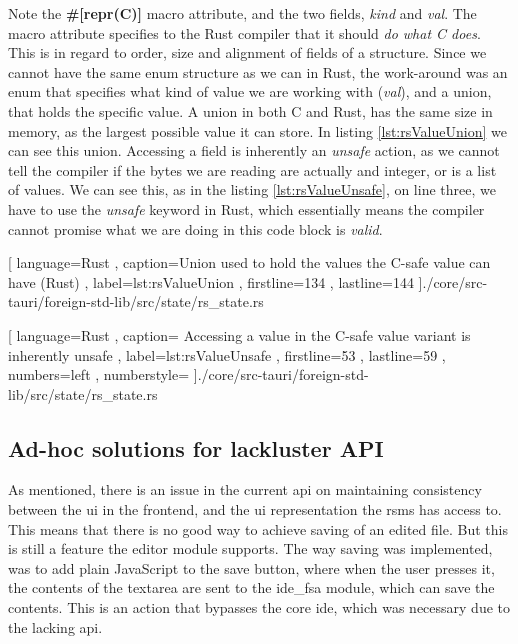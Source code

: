 Note the \textbf{\#[repr(C)]} macro attribute, and the two fields,
\textit{kind} and \textit{val}. The macro attribute specifies to the Rust
compiler that it should \textit{do what C does}. This is in regard to order,
size and alignment of fields of a structure. Since we cannot have the same enum
structure as we can in Rust, the work-around was an enum that specifies what
kind of value we are working with (\textit{val}), and a union, that holds the
specific value. A union in both C and Rust, has the same size in memory, as the
largest possible value it can store. In listing \ref{lst:rsValueUnion} we can
see this union. Accessing a field is inherently an \textit{unsafe} action, as we
cannot tell the compiler if the bytes we are reading are actually and integer,
or is a list of values. We can see this, as in the listing
\ref{lst:rsValueUnsafe}, on line three, we have to use the \textit{unsafe}
keyword in Rust, which essentially means the compiler cannot promise what we are
doing in this code block is \textit{valid}.

\begin{code}
  
    [ language=Rust
    , caption={Union used to hold the values the C-safe value can have (Rust)}
    , label=lst:rsValueUnion
    , firstline=134
    , lastline=144
    ]{./core/src-tauri/foreign-std-lib/src/state/rs\_state.rs}
\end{code}

\begin{code}
  
    [ language=Rust
    , caption={
      Accessing a value in the C-safe value variant is inherently unsafe
    }
    , label=lst:rsValueUnsafe
    , firstline=53
    , lastline=59
    , numbers=left
    , numberstyle=\tiny\color{gray}
    ]{./core/src-tauri/foreign-std-lib/src/state/rs\_state.rs}
\end{code}

\subsection{Ad-hoc solutions for lackluster API}

As mentioned, there is an issue in the current \gls{api} on maintaining
consistency between the \gls{ui} in the frontend, and the \gls{ui}
representation the \gls{rsms} has access to. This means that there is no
good way to achieve saving of an edited file. But this is still a feature the
editor module supports. The way saving was implemented, was to add plain
JavaScript to the save button, where when the user presses it, the contents
of the textarea are sent to the \gls{ide}\_fsa module, which can save the
contents. This is an action that bypasses the core \gls{ide}, which was
necessary due to the lacking \gls{api}.

